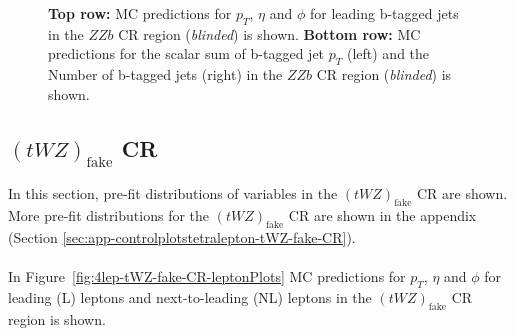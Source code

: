 \begin{figure}[htbp]
    \caption{\textbf{Top row:} MC predictions for $p_{T}$, $\eta$ and $\phi$ for leading b-tagged jets in the $ZZb$ CR region (\textit{blinded}) is shown. \textbf{Bottom row:} MC predictions for the scalar sum of b-tagged jet $p_{T}$ (left) and the Number of b-tagged jets (right) in the $ZZb$ CR region (\textit{blinded}) is shown.}
  \label{fig:4lep-ZZb-CR-bjetPlots}
\end{figure}



\subsection{$(tWZ)_{\text{fake}}$ CR}
\label{sec:controlplotstetralepton-tWZ-fake-CR}


In this section, pre-fit distributions of variables in the $(tWZ)_{\text{fake}}$ CR are shown. More pre-fit distributions for the $(tWZ)_{\text{fake}}$ CR are shown in the appendix (Section \ref{sec:app-controlplotstetralepton-tWZ-fake-CR}).\\\\

In Figure~\ref{fig:4lep-tWZ-fake-CR-leptonPlots} MC predictions for $p_{T}$, $\eta$ and $\phi$ for leading (L) leptons and next-to-leading (NL) leptons in the $(tWZ)_{\text{fake}}$ CR region is shown.

